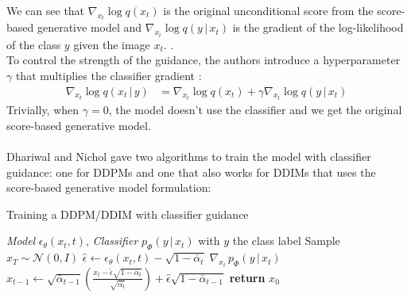 \documentclass{article}
\begin{document}
We can see that $\nabla_{x_t} \log q(x_t)$ is the original unconditional score from the score-based generative model and $\nabla_{x_t} \log q(y \, | \, x_t)$ is the gradient of the log-likelihood of the class $y$ given the image $x_t$. \cite{dhariwal2021diffusion, luo2022understanding}. \\
To control the strength of the guidance, the authors introduce a hyperparameter $\gamma$ that multiplies the classifier gradient \cite{dhariwal2021diffusion,luo2022understanding}:
\begin{align}
  \nabla_{x_t} \log q(x_t \, | \, y) &= \nabla_{x_t} \log q(x_t) + \gamma \nabla_{x_t} \log q(y \, | \, x_t)
\end{align}
Trivially, when $\gamma = 0$, the model doesn't use the classifier and we get the original score-based generative model.
\\\\
Dhariwal and Nichol \cite{dhariwal2021diffusion} gave two algorithms to train the model with classifier guidance: one for DDPMs and one that also works for DDIMs that uses the score-based generative model formulation:
\begin{algorithm}[H]
  \centering
  \caption{Training a DDPM/DDIM with classifier guidance}\label{alg:ddpm_classifier}
  \begin{algorithmic}[1]
    \Require \textit{Model} $\epsilon_\theta (x_t, t)$, \textit{Classifier} $p_\Phi (y \, | \, x_t)$ with $y$ the class label
    \State Sample $x_T \sim \mathcal{N}(0, I)$
      \State $\hat{\epsilon} \leftarrow \epsilon_\theta (x_t, t) - \sqrt{1 - \bar{\alpha}_t} \; \nabla_{x_t} \, p_\Phi (y \, | \, x_t)$
      \State $x_{t-1} \leftarrow \sqrt{\bar{\alpha}_{t-1}} \left( \frac{x_t - \hat{\epsilon} \sqrt{1 - \bar{\alpha}_t}}{\sqrt{\bar{\alpha}_t}} \right) + \hat{\epsilon} \sqrt{1 - \bar{\alpha}_{t-1}}$
    \EndFor
    \State \textbf{return} $x_0$
  \end{algorithmic}
\end{algorithm}
\end{document}
